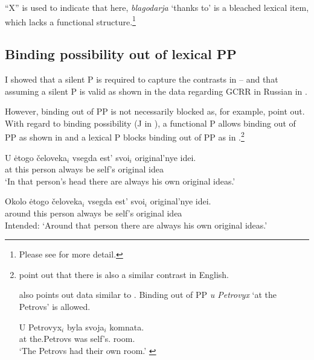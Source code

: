 \documentclass[output=paper,
]{langscibook}
\begin{document}
\noindent
``X'' is used to indicate that here, \textit{blagodarja} `thanks to' is a bleached lexical item, which lacks a functional structure.\footnote{
			Please see \citet{YadroffFranks2001} for more detail.
			}


\subsection{Binding possibility out of lexical PP}

I showed that a silent P is required to capture the contrasts in --  
and that assuming a silent P is valid as shown in the data regarding GCRR in Russian in .

However, binding out of PP is not necessarily blocked as, for example, \citet{YadroffFranks2001, Bailyn2010} point out.
With regard to binding possibility (J in ), a functional P allows binding out of PP as shown in  and a lexical P blocks binding out of PP as in .\footnote{
			\citet{YadroffFranks2001} point out that there is also a similar contrast in English.
			\ea
\hfill \citep[74]{YadroffFranks2001}
			\z\z
			
			\noindent
			\citet{Bailyn2010} also points out data similar to .
			Binding out of PP \textit{u Petrovyx} `at the Petrovs' is allowed.			
			
			\ea\label{ppbind2}
			\gll	U Petrovyx$_i$ byla svoja$_i$ komnata.\\
					at the.Petrovs was self's.{\NOM} room.{\NOM}\\
			\glt `The Petrovs had their own room.'
			\hfill\citep[14]{Bailyn2010}
			\z}

\begin{exe}\ex \label{ppbind}
\begin{xlist}
\ex \label{ppbinda}
\gll	U ėtogo čeloveka$_i$ vsegda est' svoi$_i$ original'nye idei.\\
		at this person always be self's original idea\\\samepage
\trans `In that person's head there are always his own original ideas.'

\ex\label{ppbindb}	
\gll	* Okolo ėtogo čeloveka$_i$ vsegda est' svoi$_i$ original'nye idei.\\
		{} around this person always be self's original idea\\
\trans Intended: `Around that person there are always his own original ideas.'
\end{xlist}\samepage\hfill\citep[74]{YadroffFranks2001}
\end{exe}
\end{document}
